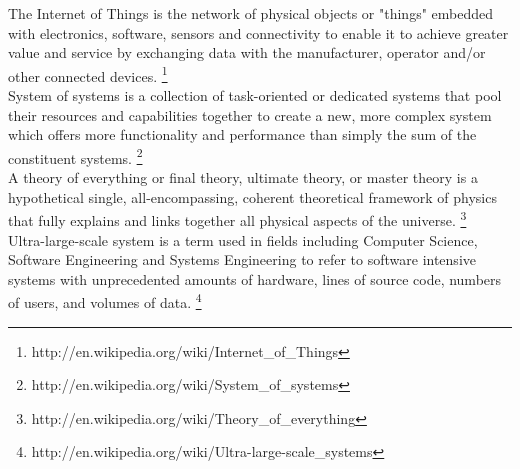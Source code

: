 \begin{acronym}
		The Internet of Things is the network of physical objects or "things"
		embedded with electronics, software, sensors and connectivity to enable
		it to achieve greater value and service by exchanging data with the
		manufacturer, operator and/or other connected devices.
		\footnote{http://en.wikipedia.org/wiki/Internet\_of\_Things}
	\\
		System of systems is a collection of task-oriented or dedicated systems
		that pool their resources and capabilities together to create a new,
		more complex system which offers more functionality and performance
		than simply the sum of the constituent systems.
		\footnote{http://en.wikipedia.org/wiki/System\_of\_systems}
	\\
		A theory of everything or final theory, ultimate theory, or master
		theory is a hypothetical single, all-encompassing, coherent theoretical
		framework of physics that fully explains and links together all
		physical aspects of the universe.
		\footnote{http://en.wikipedia.org/wiki/Theory\_of\_everything}
	\\
		Ultra-large-scale system is a term used in fields including Computer
		Science, Software Engineering and Systems Engineering to refer to
		software intensive systems with unprecedented amounts of hardware,
		lines of source code, numbers of users, and volumes of data.
		\footnote{http://en.wikipedia.org/wiki/Ultra-large-scale\_systems}
\end{acronym}